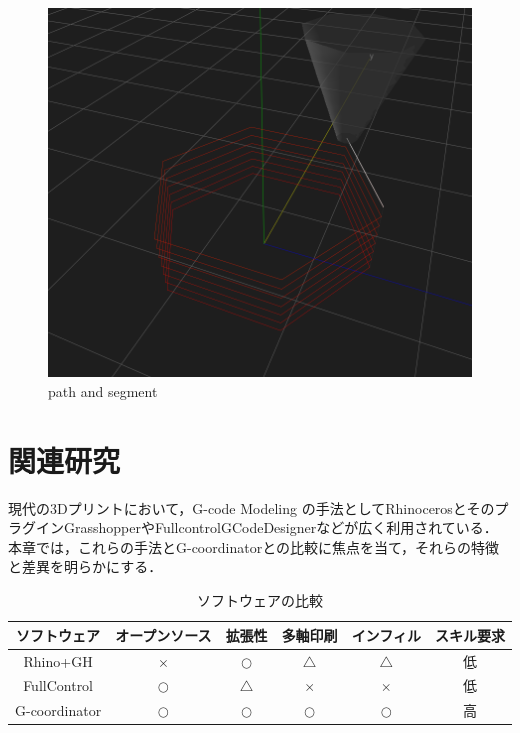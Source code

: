 \documentclass{article}
\begin{document}
\begin{twocolumn}
\begin{figure}[htbp]
  \includegraphics[width=\linewidth]{img/path_segment.png}
  \caption{path and segment}
  \label{fig:2}
\end{figure}

\section{関連研究}
現代の3Dプリントにおいて，G-code Modeling の手法としてRhinocerosとそのプラグインGrasshopperやFullcontrolGCodeDesignerなどが広く利用されている．
本章では，これらの手法とG-coordinatorとの比較に焦点を当て，それらの特徴と差異を明らかにする．
\begin{table}
  \centering
  \caption{ソフトウェアの比較}
  \label{table:software_comparison}
  \begin{tabular}{|c|c|c|c|c|c|}
    \hline
    \textbf{ソフトウェア} & \textbf{オープンソース} & \textbf{拡張性} & \textbf{多軸印刷} & \textbf{インフィル} & \textbf{スキル要求} \\
    \hline
    Rhino+GH & $\times$ & $\bigcirc$ & $\triangle$ & $\triangle$ & 低 \\
    \hline
    FullControl & $\bigcirc$ & $\triangle$ & $\times$ & $\times$ & 低 \\
    \hline
    G-coordinator & $\bigcirc$ & $\bigcirc$ & $\bigcirc$ & $\bigcirc$ & 高 \\
    \hline
  \end{tabular}
\end{table}


\end{twocolumn}
\end{document}
